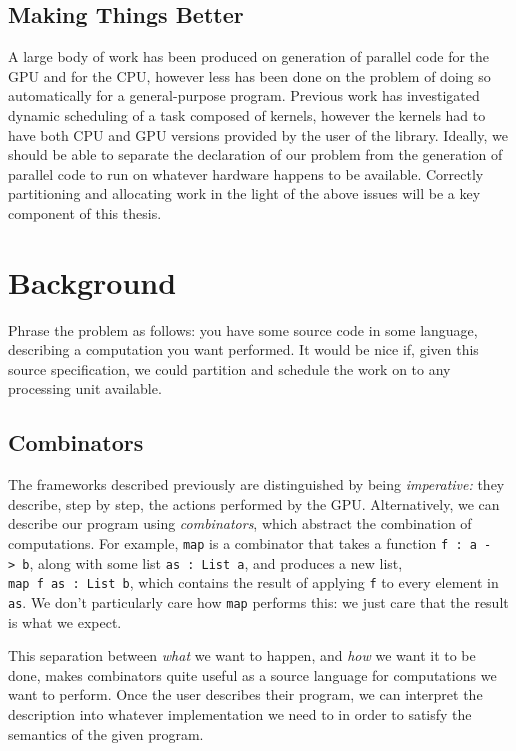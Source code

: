 \documentclass[a4paper,12pt]{article}
\newcommand{\icf}[1]{\mbox{\texttt{#1}}} %
\begin{document}
\subsection{Making Things Better}

A large body of work has been produced on generation of parallel code for the GPU and for the CPU, \citep{lee_transparent_2013} however less has been done on the problem of doing so automatically for a general-purpose program. 
Previous work has investigated dynamic scheduling of a task composed of kernels, however the kernels had to have both CPU and GPU versions provided by the user of the library.  \citep{wang_cpu+gpu_2014}
Ideally, we should be able to separate the declaration of our problem from the generation of parallel code to run on whatever hardware happens to be available.
Correctly partitioning and allocating work in the light of the above issues will be a key component of this thesis.

\section{Background}
Phrase the problem as follows: you have some source code in some language, describing a computation you want performed. 
It would be nice if, given this source specification, we could partition and schedule the work on to any processing unit available. 

\subsection{Combinators}
The frameworks described previously are distinguished by being \textit{imperative:} they describe, step by step, the actions performed by the GPU.
Alternatively, we can describe our program using \textit{combinators}, which abstract the combination of computations. 
For example, \icf{map} is a combinator that takes a function \icf{f\ :\  a\ ->\ b}, along with some list \icf{as\ :\ List\ a}, and produces a new list, \icf{map\ f\ as\ :\ List\ b}, which contains the result of applying \icf{f} to every element in \icf{as}. 
We don't particularly care how \icf{map} performs this: we just care that the result is what we expect.

This separation between \textit{what} we want to happen, and \textit{how} we want it to be done, makes combinators quite useful as a source language for computations we want to perform.  
Once the user describes their program, we can interpret the description into whatever implementation we need to in order to satisfy the semantics of the given program.
\end{document}
